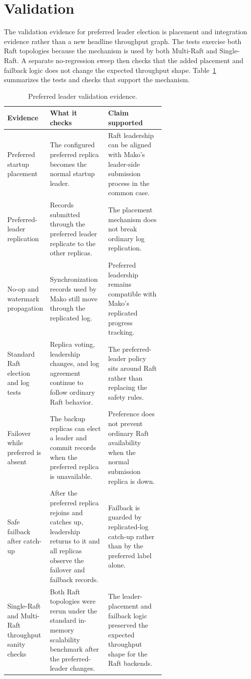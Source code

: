 \section{Validation}

The validation evidence for preferred leader election is placement and
integration evidence rather than a new headline throughput graph. The tests
exercise both Raft topologies because the mechanism is used by both Multi-Raft
and Single-Raft. A separate no-regression sweep then checks that the added
placement and failback logic does not change the expected throughput shape.
Table~\ref{tab:preferred-validation} summarizes the tests and checks that
support the mechanism.

\begin{table}[htbp]
\centering
\caption[Preferred leader validation]{Preferred leader validation evidence.}
\label{tab:preferred-validation}
\small
\begin{tabularx}{\linewidth}{@{}>{\raggedright\arraybackslash}p{0.27\linewidth}>{\raggedright\arraybackslash}p{0.37\linewidth}>{\raggedright\arraybackslash}X@{}}
\toprule
\textbf{Evidence} & \textbf{What it checks} & \textbf{Claim supported} \\
\midrule
Preferred startup placement &
The configured preferred replica becomes the normal startup leader. &
Raft leadership can be aligned with Mako's leader-side submission process in the common case. \\
\addlinespace
Preferred-leader replication &
Records submitted through the preferred leader replicate to the other replicas. &
The placement mechanism does not break ordinary log replication. \\
\addlinespace
No-op and watermark propagation &
Synchronization records used by Mako still move through the replicated log. &
Preferred leadership remains compatible with Mako's replicated progress tracking. \\
\addlinespace
Standard Raft election and log tests &
Replica voting, leadership changes, and log agreement continue to follow ordinary Raft behavior. &
The preferred-leader policy sits around Raft rather than replacing the safety rules. \\
\addlinespace
Failover while preferred is absent &
The backup replicas can elect a leader and commit records when the preferred replica is unavailable. &
Preference does not prevent ordinary Raft availability when the normal submission replica is down. \\
\addlinespace
Safe failback after catch-up &
After the preferred replica rejoins and catches up, leadership returns to it and all replicas observe the failover and failback records. &
Failback is guarded by replicated-log catch-up rather than by the preferred label alone. \\
\addlinespace
Single-Raft and Multi-Raft throughput sanity checks &
Both Raft topologies were rerun under the standard in-memory scalability benchmark after the preferred-leader changes. &
The leader-placement and failback logic preserved the expected throughput shape for the Raft backends. \\
\bottomrule
\end{tabularx}
\end{table}

